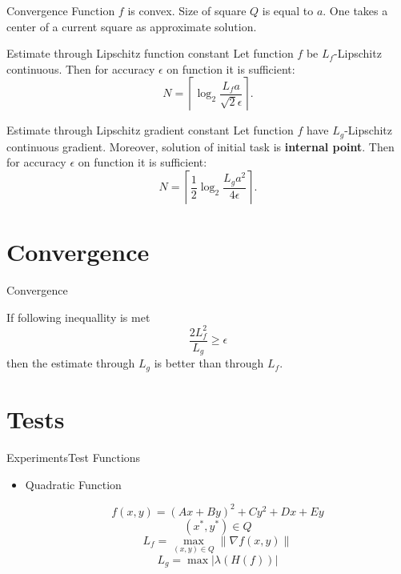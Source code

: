 \documentclass{beamer}
\begin{document}
\begin{frame}{Convergence}
Function $f$ is convex. Size of square $Q$ is equal to $a$. One takes a center of a current square as approximate  solution.
\begin{block}{Estimate through Lipschitz function constant}
Let function $f$ be $L_f$-Lipschitz continuous. Then for accuracy $\epsilon$ on function it is sufficient:
\begin{equation}\label{NI1}N = \left\lceil\log_2\frac{L_fa}{\sqrt{2}\epsilon}\right\rceil.\end{equation}
\end{block}

\begin{block}{Estimate through Lipschitz gradient constant}
Let function $f$ have $L_g$-Lipschitz continuous gradient. Moreover, solution of initial task is \textbf{internal point}. Then for accuracy $\epsilon$ on function it is sufficient:
\begin{equation}\label{NI3}N = \left\lceil\frac{1}{2}\log_2\frac{L_ga^2}{4\epsilon}\right\rceil.\end{equation}
\end{block}
\end{frame}

\section{Convergence}

\begin{frame}{Convergence}

If following inequallity is met
$$\frac{2L_f^2}{L_g} \geq \epsilon$$
then the estimate through $L_g$ is better than through $L_f$.
\end{frame}

\section{Tests}

\begin{frame}{Experiments}{Test Functions}

\begin{itemize}
\item{Quadratic Function

$$f(x,y) = (Ax+By)^2+Cy^2 + Dx+Ey$$
$$(x^*, y^*)\in Q$$
$$L_f = \max\limits_{(x,y) \in Q}\|\nabla f(x, y)\|$$
$$L_g = \max |\lambda\left(H(f)\right)|$$
}
\end{itemize}
\end{frame}
\end{document}
